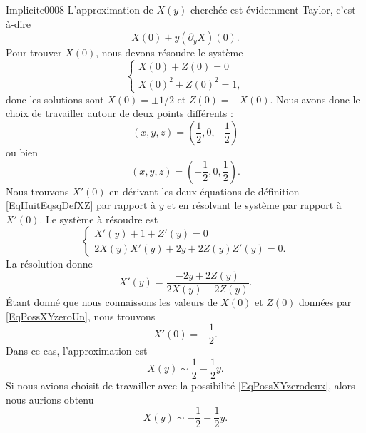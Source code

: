 \begin{corrige}{Implicite0008}
	L'approximation de $X(y)$ cherchée est évidemment Taylor, c'est-à-dire
	\begin{equation}
		X(0)+y(\partial_yX)(0).
	\end{equation}
	Pour trouver $X(0)$, nous devons résoudre le système
	\begin{equation}
		\left\{
		\begin{array}{ll}
			X(0)+Z(0)=0\\
			X(0)^2+Z(0)^2=1,
		\end{array}
		\right.
	\end{equation}
	donc les solutions sont $X(0)=\pm 1/2$ et $Z(0)=-X(0)$. Nous avons donc le choix de travailler autour de deux points différents :
	\begin{equation}		\label{EqPossXYzeroUn}
		(x,y,z)=(\frac{1}{ 2 },0,-\frac{1}{ 2 })
	\end{equation}
	ou bien
	\begin{equation}		\label{EqPossXYzerodeux}
		(x,y,z)=(-\frac{1}{ 2 },0,\frac{1}{ 2 }).
	\end{equation}
	Nous trouvons $X'(0)$ en dérivant les deux équations de définition \eqref{EqHuitEqsqDefXZ} par rapport à $y$ et en résolvant le système par rapport à $X'(0)$. Le système à résoudre est
	\begin{equation}
		\left\{
		\begin{array}{ll}
			X'(y)+1+Z'(y)=0\\
			2X(y)X'(y)+2y+2Z(y)Z'(y)=0.
		\end{array}
		\right.
	\end{equation}
	La résolution donne
	\begin{equation}
		X'(y)=\frac{ -2y+2Z(y) }{ 2X(y)-2Z(y) }.
	\end{equation}
	Étant donné que nous connaissons les valeurs de $X(0)$ et $Z(0)$ données par \eqref{EqPossXYzeroUn}, nous trouvons
	\begin{equation}
		X'(0)=-\frac{1}{ 2 }.
	\end{equation}
	Dans ce cas, l'approximation est
	\begin{equation}
		X(y)\sim \frac{ 1 }{2}-\frac{ 1 }{2}y.
	\end{equation}
	Si nous avions choisit de travailler avec la possibilité \eqref{EqPossXYzerodeux}, alors nous aurions obtenu
	\begin{equation}
		X(y)\sim -\frac{ 1 }{2}-\frac{ 1 }{2}y.
	\end{equation}

\end{corrige}

